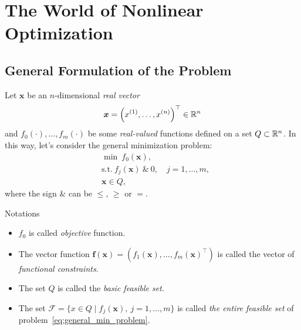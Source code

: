 \section{The World of Nonlinear Optimization}\label{sec:the_world_of_nonlinear_optimization}

\subsection{General Formulation of the Problem}\label{subsec:general_formulation_of_the_problem}
Let \(\bm{x}\) be an \(n\)-dimensional \emph{real vector}
\[
    \bm{x} = \left( x^{(1)}, \dots, x^{(n)} \right)^\top \in \mathbb{R}^n
\]
and \(f_0(\cdot), \dots, f_m(\cdot)\) be some \emph{real-valued} functions defined on a set \(Q \subset \mathbb{R}^n\). In this way, let's consider the general minimization problem:
\begin{equation}\label{eq:general_min_problem}
    \begin{aligned}
        &\min ~ f_0(\bm{x}), \\
        &\text{s.t.}~f_j(\bm{x}) ~ \& ~ 0, \quad j = 1, \dots, m,\\
        &\bm{x} \in Q,
    \end{aligned}
\end{equation}
where the sign \(\&\) can be \(\le\), \(\ge\) or \(=\).

\begin{note}{Notations}
    \begin{itemize}
        \item \(f_0\) is called \emph{objective} function.
        \item The vector function \(\bm{f}(\bm{x}) = \left( f_1(\bm{x}), \dots, f_m(\bm{x})^\top \right)\) is called the vector of \emph{functional constraints}.
        \item The set \(Q\) is called the \emph{basic feasible set}.
        \item The set \( \mathscr{F} = \{ x \in Q \mid f_j(\bm{x}), ~j=1, \dots, m \}\) is called \emph{the entire feasible set} of problem~\ref{eq:general_min_problem}. 
    \end{itemize}
\end{note}

